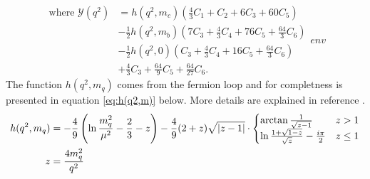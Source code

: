 \documentclass[english]{uzhpub}
\begin{document}
\begin{equation}
 \begin{split}
  \text{where   } \mathcal{Y} (q^2) &= h(q^2,m_c) \left( \frac{4}{3}C_1 + C_2 + 6C_3 + 60C_5 \right) \\
  &- \frac{1}{2} h(q^2,m_b) \left(7C_3 + \frac{4}{3}C_4 + 76C_5 + \frac{64}{3} C_6  \right) \\
  &- \frac{1}{2} h(q^2,0) \left( C_3 + \frac{4}{3}C_4 + 16C_5 + \frac{64}{3} C_6 \right) \\
  &+ \frac{4}{3} C_3 + \frac{64}{9} C_5 + \frac{64}{27} C_6 .
 \end{split}env
\end{equation}
The function $h(q^2,m_q)$ comes from the fermion loop and for completness is presented in equation \ref{eq:h(q2,m)} below. More details are explained in reference  \cite{bib:Wilson}.
\begin{align}
 h(q^2,m_q)                                            & = - \frac{4}{9} \left(\ln{\frac{m_q^2}{\mu^2}} - \frac{2}{3} - z \right) - \frac{4}{9}(2+z) \sqrt{|z-1|}  \cdot  \begin{cases}
 \arctan{\frac{1}{\sqrt{z-1}}}                         & z > 1                                                                                                                          \\
 \ln{\frac{1+ \sqrt{1-z}}{\sqrt{z}}} - \frac{i \pi}{2} & z \leq 1
 \end{cases}
 \label{eq:h(q2,m)} \\
 \notag z                                              & = \frac{4m_q^2}{q^2}
\end{align}
\end{document}
